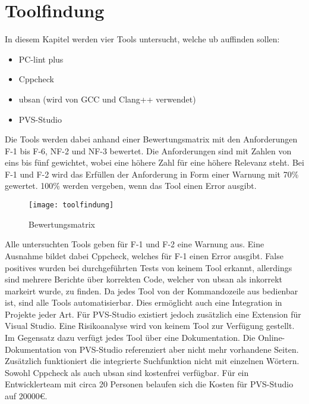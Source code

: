 \chapter{Toolfindung}
\label{ch:toolfindung}

In diesem Kapitel werden vier Tools untersucht, welche \gls{ub} auffinden sollen:
\begin{itemize}
    \item PC-lint plus
    \item Cppcheck
    \item \gls{ubsan} (wird von GCC und Clang++ verwendet)
    \item PVS-Studio
\end{itemize}
Die Tools werden dabei anhand einer Bewertungsmatrix mit den Anforderungen F-1 bis F-6, NF-2 und NF-3 bewertet. Die Anforderungen sind mit Zahlen von eins bis fünf gewichtet, wobei 
eine höhere Zahl für eine höhere Relevanz steht. Bei F-1 und F-2 wird das Erfüllen der Anforderung in Form einer Warnung mit 70\% gewertet. 100\% werden vergeben, wenn das Tool einen 
Error ausgibt.
\begin{figure}[htpb]
    \centering
    \texttt{[image: toolfindung]}
    \caption{Bewertungsmatrix}
    \label{img:toolfindung}
\end{figure}

Alle untersuchten Tools geben für F-1 und F-2 eine Warnung aus. Eine Ausnahme bildet dabei Cppcheck, welches für F-1 einen Error ausgibt. \newline
False positives wurden bei durchgeführten Tests von keinem Tool erkannt, allerdings sind mehrere Berichte über korrekten Code, welcher von \gls{ubsan} als inkorrekt markeirt wurde, 
zu finden. \newline
Da jedes Tool von der Kommandozeile aus bedienbar ist, sind alle Tools automatisierbar. Dies ermöglicht auch eine Integration in Projekte jeder Art. Für PVS-Studio existiert jedoch 
zusätzlich eine Extension für Visual Studio. \newline
Eine Risikoanalyse wird von keinem Tool zur Verfügung gestellt. \newline
Im Gegensatz dazu verfügt jedes Tool über eine Dokumentation. Die Online-Dokumentation von PVS-Studio referenziert aber nicht mehr vorhandene Seiten. Zusätzlich funktioniert die 
integrierte Suchfunktion nicht mit einzelnen Wörtern. \newline
Sowohl Cppcheck als auch \gls{ubsan} sind kostenfrei verfügbar. Für ein Entwicklerteam mit circa 20 Personen belaufen sich die Kosten für PVS-Studio auf 20000€.

